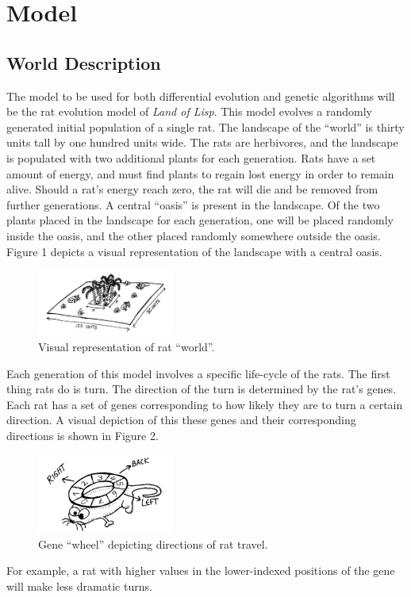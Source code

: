 \documentclass{sig-alternate}
\begin{document}
\section{Model}
\label{sec:Model}
\subsection{World Description}
The model to be used for both differential evolution and genetic algorithms will be the rat evolution model of \emph{Land of Lisp}.  This model evolves a randomly generated initial population of a single rat.  The landscape of the ``world'' is thirty units tall by one hundred units wide.  The rats are herbivores, and the landscape is populated with two additional plants for each generation.  Rats have a set amount of energy, and must find plants to regain lost energy in order to remain alive.  Should a rat's energy reach zero, the rat will die and be removed from further generations.  A central ``oasis'' is present in the landscape.  Of the two plants placed in the landscape for each generation, one will be placed randomly inside the oasis, and the other placed randomly somewhere outside the oasis.  Figure 1 depicts a visual representation of the landscape with a central oasis. \cite{LOL}
\begin{figure}
\centering
\includegraphics[width=0.4\textwidth]{landscape.PNG}
\caption{Visual representation of rat ``world''.}
\end{figure}

Each generation of this model involves a specific life-cycle of the rats.  The first thing rats do is turn.  The direction of the turn is determined by the rat's genes.  Each rat has a set of genes corresponding to how likely they are to turn a certain direction.  A visual depiction of this these genes and their corresponding directions is shown in Figure 2.  \cite{LOL}
\begin{figure}
\centering
\includegraphics[width=0.4\textwidth]{rat_wheel.PNG}
\caption{Gene ``wheel'' depicting directions of rat travel.}
\end{figure}
For example, a rat with higher values in the lower-indexed positions of the gene will make less dramatic turns.  
\end{document}
